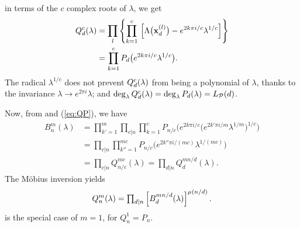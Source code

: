 \documentclass{ws-ijbc}
\begin{document}
  in terms of the $c$ complex roots of $\lambda$,
  we get
%
\begin{align}
Q_d^{c}(\lambda)
  &=
    \prod_l
    \left\{
      \prod_{k=1}^c \,
      \left[
          \Lambda\big(\mathbf{x}_{d}^{(l)}\big)
          -
          e^{2k\pi i/c} \lambda^{1/c}
      \right]
    \right\}
    \notag \\
  &=  \prod_{k=1}^c P_d\big(e^{2k\pi i/c} \lambda^{1/c}\big).
\label{eq:QP}
\end{align}
%
%
The radical $\lambda^{1/c}$
  does not prevent
  $Q_d^c(\lambda)$ from being a polynomial of $\lambda$,
  thanks to the invariance
  $\lambda \rightarrow e^{2\pi i} \lambda$;
and
  $\deg_\lambda Q_d^c(\lambda)
    = \deg_\lambda P_d(\lambda) = L_\mathcal P(d)$.






Now, from  and (\ref{eq:QP}), we have
\begin{align*}
 B_n^m (\lambda)
 & = \prod_{k' = 1}^m \prod_{c | n} \prod_{k=1}^c
      P_{n/c}\Big(
        e^{2k\pi i/c}
        \big(
          e^{2 k' \pi i/m} \lambda^{1/m}
        \big)^{1/c}
      \Big) \\
 & = \prod_{c | n} \prod_{k''=1}^{m c}
    P_{n/c}\big(
      e^{2k''\pi i/(m c)} \lambda^{1/(m c)}
      \big) \\
 &
  = \prod_{c | n} Q_{n/c}^{m c}(\lambda)
  = \prod_{d | n} Q_{d}^{m n/d}(\lambda).
\end{align*}
The M\"obius inversion yields
\begin{equation}
Q_n^m(\lambda)
= \textstyle\prod_{d|n}
  \left[
    B_d^{m n/d}(\lambda)
  \right]^{\mu(n/d)}.
\notag
\end{equation}
 is the special case of $m = 1$,
for $Q_n^1 = P_n$.
\end{document}
